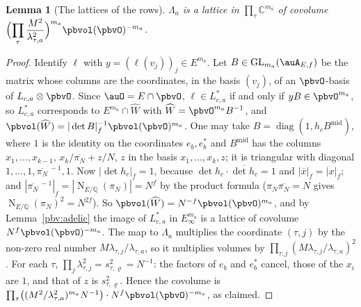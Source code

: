 \documentclass[10pt]{amsart}
\newtheorem{lemma}[theorem]{Lemma}
\theoremstyle{definition}
\theoremstyle{remark}
\newcommand{\C}{\mathbb C}
\newcommand{\Q}{\mathbb Q}
\providecommand{\auGL}{\mathrm{GL}}
\providecommand{\aubar}[1]{\overline{#1}}
\begin{document}
\begin{lemma}[The lattices of the rows]\label{pbv:vol-a}
$\Lambda_a$ is a lattice in $\prod_\tau\C^{m_a}$ of covolume
$\displaystyle\Bigl(\prod_\tau\frac{M^2}{\lambda_{\tau,a}^2}\Bigr)^{m_a}\pbvol(\pbvO)^{-m_a}$.
\end{lemma}
\begin{proof}
Identify $\ell$ with $y=(\ell(v_j))_j\in E^{m_a}$. Let $B\in\auGL_{m_a}(\auA_{E,f})$ be the matrix whose
columns are the coordinates, in the basis $(v_j)$, of an $\pbvO$-basis of $L_{c,a}\otimes\pbvO$. Since
$\auO=E\cap\pbvO$, $\ell\in L_{c,a}^*$ if and only if $yB\in\pbvO^{m_a}$, so $L_{c,a}^*$ corresponds to
$E^{m_a}\cap\widehat W$ with $\widehat W=\pbvO^{m_a}B^{-1}$, and $\pbvol(\widehat W)=|\det B|_f^{-1}\pbvol(
\pbvO)^{m_a}$. One may take $B=\operatorname{diag}(1,h_cB^{\mathrm{mid}})$, where $1$ is the identity on the
coordinates $e_b,e_b^*$ and $B^{\mathrm{mid}}$ has the columns $x_1,\dots,x_{k-1}$, $x_k/\aubar{\pi_N}+z/N$,
$z$ in the basis $x_1,\dots,x_k,z$; it is triangular with diagonal $1,\dots,1,\aubar{\pi_N}^{\,-1},1$. Now
$|\det h_c|_f=1$, because $\det h_c\cdot\aubar{\det h_c}=1$ and $|\aubar x|_f=|x|_f$; and $|\aubar{\pi_N}^{\,-1}|_f
=|\operatorname N_{E/\Q}(\pi_N)|=N^f$ by the product formula ($\pi_N\aubar{\pi_N}=N$ gives $\operatorname N_{E/\Q}
(\pi_N)^2=N^{2f}$). So $\pbvol(\widehat W)=N^{-f}\pbvol(\pbvO)^{m_a}$, and by Lemma~\ref{pbv:adelic} the
image of $L_{c,a}^*$ in $E_\infty^{m_a}$ is a lattice of covolume $N^f\pbvol(\pbvO)^{-m_a}$. The map to
$\Lambda_a$ multiplies the coordinate $(\tau,j)$ by the non-zero real number $M\lambda_{\tau,j}/\lambda_{\tau,a}$,
so it multiplies volumes by $\prod_{\tau,j}(M\lambda_{\tau,j}/\lambda_{\tau,a})^2$. For each $\tau$,
$\prod_j\lambda_{\tau,j}^2=s_{\tau,\varrho}^2=N^{-1}$: the factors of $e_b$ and $e_b^*$ cancel, those of the
$x_i$ are $1$, and that of $z$ is $s_{\tau,\varrho}^2$. Hence the covolume is $\prod_\tau\bigl((M^2/
\lambda_{\tau,a}^2)^{m_a}N^{-1}\bigr)\cdot N^f\pbvol(\pbvO)^{-m_a}$, as claimed.
\end{proof}
\end{document}
